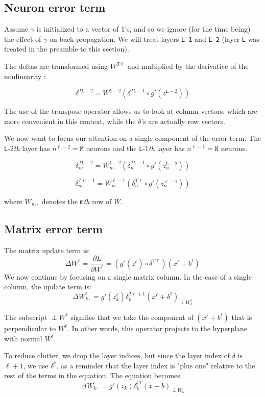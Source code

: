 \documentclass[]{article}
\begin{document}
	\subsection{Neuron error term}
 		Assume $\gamma$ is initialized to a vector of 1's, and so we ignore (for the time being) the effect of $\gamma$ on back-propagation. We will treat layers \texttt{L-1} and \texttt{L-2} (layer \texttt{L} was treated in the preamble to this section).
 		
 		The deltas are transformed using $W^{T\ell}$ and multiplied by the derivative of the nonlinearity :
 		
 		$$\delta^{T\mathtt{L}-2} = W^{\mathtt{L}-2} (\delta^{T\mathtt{L-1}} \circ g'(z^{\mathtt{L}-2}))$$
 		
 		The use of the transpose operator allows us to look at column vectors, which are more convenient in this context, while the $\delta$'s are actually row vectors.
 		
 		We now want to focus our attention on a single component of the error term. The \texttt{L}-2\textit{th} layer has $n^{\ell-2}=\mathtt{M}$ neurons and the \texttt{L}-1\textit{th} layer has $n^{\ell-1}=\mathtt{N}$  neurons.
 		
 		
 		$$\delta^{T\mathtt{L}-2}_m = W^{\mathtt{L}-2}_{m \cdot} (\delta^{T\mathtt{L-1}}_n \circ g'(z^{\mathtt{L}-2}_n))$$
 		
 		$$\delta^{T\ell-1}_m = W^{\ell-1}_{m \cdot} (\delta^{T\ell}_n \circ g'(z^{\ell-1}_n))$$
 		
 		where $W_{m\cdot}$ denotes the \texttt{m}\textit{th} row of $W$.
 		 
 		 
 		 
  	\subsection{Matrix error term}
		The matrix update term is:
  			$$ \Delta W^\ell = \frac{\partial L}{\partial W^\ell} = (g'(z^{\ell}) \circ  \delta^{T\ell}) (x^{\ell}+b^{\ell})$$
 		We now continue by focusing on a single matrix column. In the case of a single column, the update term is:
	  		$$\Delta W^\ell_{k\cdot}  = g'(z^{\ell}_k)  \delta^{T\ell+1}_k (x^{\ell}+b^{\ell})_{\perp W^\ell_k}$$
		

	  	The subscript $\perp W^\ell$ signifies that we take the component of $(x^{\ell}+b^{\ell})$ that is perpendicular to $W^\ell$. In other words, this operator projects to the hyperplane with normal $W^\ell$.
	  	
	  	To reduce clutter, we drop the layer indices, but since the layer index of $\delta$ is $\ell+1$, we use $\delta^\dagger$. as a reminder that the layer index is "plus one" relative to the rest of the terms in the equation. The equation becomes
		  		$$\Delta W_{k\cdot}  = g'(z_k)  \delta^{\dagger T}_k (x+b)_{\perp W_k}$$
	
\end{document}

